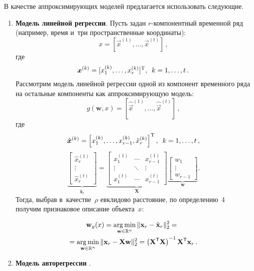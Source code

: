 \begin{multicols}{2}
В качестве аппроксимирующих моделей предлагается использовать следующие.
\begin{enumerate}[1.]
\item \textbf{Модель линейной регрессии}.
Пусть задан $r$-ком\-по\-нент\-ный временной 
ряд (например, время и~три пространственные координаты):
$$
x = [\vec{x}^{(1)}, \dots, \vec{x}^{(t)}]\,,
$$
где
$$
\vec{x}^{(k)}=[x_1^{(k)},\dots,x_r^{(k)}]^{\mathrm{T}},\enskip k=1,\dots,t\,.
$$
Рассмотрим модель линейной регрессии одной из компонент 
временн$\acute{\mbox{о}}$го ряда на остальные компоненты как аппроксимирующую модель:
$$
g(\mathbf{w},x)=\left[\hat{\vec{x}}^{(1)},\dots,\hat{\vec{x}}^{(t)}\right]\,,
$$
 где 
 $$
\hat{\vec{x}}^{(k)}=\left[x_1^{(k)},\dots,x_{r-1}^{(k)},\hat{x}_r^{(k)}\right]^{\mathrm{T}},\enskip 
k\hm=1,\dots,t\,,
$$
$$
\underbrace{
\begin{bmatrix}
\hat{x}_r^{(1)} \\
\vdots  \\
\hat{x}_r^{(t)}
\end{bmatrix}
}_{\hat{\mathbf{x}}_r}
=
\underbrace{
\begin{bmatrix}
x_1^{(1)} & \cdots & x_{r-1}^{(1)} \\
\vdots    & \ddots & \vdots       \\
x_1^{(t)} & \cdots & x_{r-1}^{(t)}
\end{bmatrix}
}_{\mathbf{X}}
\underbrace{
\begin{bmatrix}
w_1 \\
\vdots  \\
w_{r-1}
\end{bmatrix}
}_{\mathbf{w}}.
$$
Тогда, выбрав в~качестве~$\rho$ евклидово расстояние, по 
определению~4 получим признаковое описание объекта~$x$:

\noindent
\begin{multline}
\label{eq:linear_regression}
\hspace*{-1mm}\mathbf{w}_g(x)=
\argmin\limits_{\mathbf{w}\in \mathbb{R}^n} \|\mathbf{x}_r-\hat{\mathbf{x}}_r\|^2_2={}\\
\hspace*{-1mm}{}=
\argmin\limits_{\mathbf{w}\in \mathbb{R}^n} \|\mathbf{x}_r-\mathbf{X}\mathbf{w}\|^2_2=
\left(\mathbf{X}^{\mathsf{T}}\mathbf{X}\right)^{-1}\mathbf{X}^{\mathsf{T}}\mathbf{x}_r\,.
\end{multline}

\item \textbf{Модель авторегрессии {}}.


\end{enumerate}
\end{multicols}
